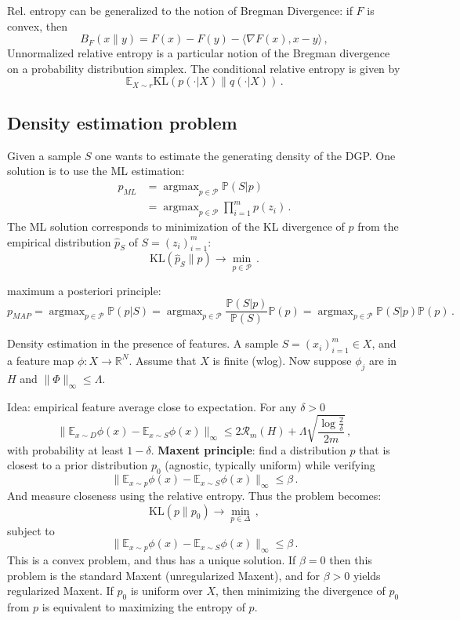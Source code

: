 \documentclass[a4paper]{article}
\newcommand{\Real}{\mathbb{R}}
\newcommand{\ex}{\mathbb{E}}
\newcommand{\pr}{\mathbb{P}}
\newcommand{\argmax}{\mathop{\text{argmax}}}
\begin{document}
Rel. entropy can be generalized to the notion of Bregman Divergence:
if $F$ is convex, then
\[ B_F(x\|y) = F(x) - F(y) - \langle \nabla F(x), x-y\rangle \,, \]
Unnormalized relative entropy is a particular notion of the Bregman divergence
on a probability distribution simplex.
The conditional relative entropy is given by
\[ \ex_{X\sim r} \text{KL}(p(\cdot|X)\|q(\cdot|X)) \,. \]


\subsection{Density estimation problem} %
\label{sub:density_estimation_problem}

Given a sample $S$ one wants to estimate the generating density of the DGP. One
solution is to use the ML estimation:
\begin{align*}
    p_{ML} &= \argmax_{p\in \mathcal{P}} \pr(S|p)\\
    &= \argmax_{p\in \mathcal{P}} \prod_{i=1}^m p(z_i) \,.
\end{align*}
The ML solution corresponds to minimization of the KL divergence of $p$ from the 
empirical distribution $\hat{p}_S$ of $S = (z_i)_{i=1}^m$:
\[ \text{KL}(\hat{p}_S\|p) \to \min_{p\in \mathcal{P}} \,. \]

maximum a posteriori principle:
\[ p_{MAP}
    = \argmax_{p\in \mathcal{P}} \pr(p|S)
    = \argmax_{p\in \mathcal{P}} \frac{\pr(S|p)}{\pr(S)} \pr(p)
    = \argmax_{p\in \mathcal{P}} \pr(S|p) \pr(p) \,. \]

Density estimation in the presence of features. A sample $S=(x_i)_{i=1}^m \in X$,
and a feature map $\phi: X\to \Real^N$. Assume that $X$ is finite (wlog). Now suppose
$\phi_j$ are in $H$ and $\|\Phi\|_\infty \leq \Lambda$.

Idea: empirical feature average close to expectation.
For any $\delta > 0$
\[ \bigl\| \ex_{x\sim D} \phi(x) - \ex_{x\sim S} \phi(x) \bigr\|_\infty
    \leq 2\mathcal{R}_m(H) + \Lambda \sqrt{\frac{\log \frac{2}{\delta}}{2m}}\,,\]
with probability at least $1-\delta$. \textbf{Maxent principle}: find a distribution
$p$ that is closest to a prior distribution $p_0$ (agnostic, typically uniform)
while verifying 
\[ \bigl\| \ex_{x\sim p} \phi(x) - \ex_{x\sim S} \phi(x) \bigr\|_\infty
    \leq \beta \,.\]
And measure closeness using the relative entropy. Thus the problem becomes:
\[ \text{KL}(p\|p_0) \to \min_{p\in \Delta} \,,\] 
subject to 
\[ \bigl\| \ex_{x\sim p} \phi(x) - \ex_{x\sim S} \phi(x) \bigr\|_\infty
    \leq \beta \,.\]
This is a convex problem, and thus has a unique solution. If $\beta=0$ then this
problem is the standard Maxent (unregularized Maxent), and for $\beta > 0$ yields
regularized Maxent. If $p_0$ is uniform over $X$, then minimizing the divergence
of $p_0$ from $p$ is equivalent to maximizing the entropy of $p$.
\end{document}
